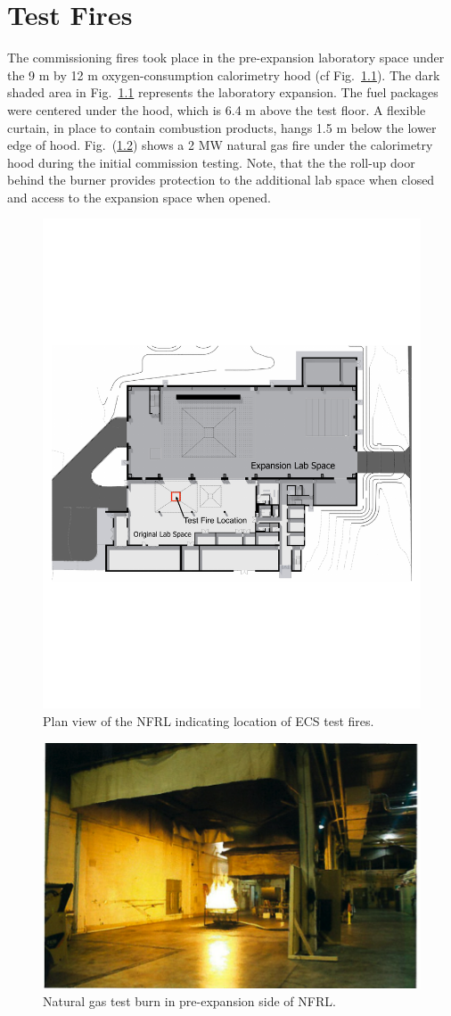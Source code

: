 \documentclass[12pt,oneside]{book}
\begin{document}
\chapter{Test Fires}
\label{test_fire}
The commissioning fires took place in the pre-expansion laboratory space under the 9 m by 12 m oxygen-consumption calorimetry hood (cf Fig.~\ref{fig:NFRL_plan}). The dark shaded area in Fig.~\ref{fig:NFRL_plan} represents the laboratory expansion. The fuel packages were centered under the hood, which is 6.4 m above the test floor. A flexible curtain, in place to contain combustion products, hangs 1.5 m below the lower edge of hood. Fig.~(\ref{fig:NFRL_fire}) shows a 2 MW natural gas fire under the calorimetry hood during the initial commission testing. Note, that the the roll-up door behind the burner provides protection to the additional lab space when closed and access to the expansion space when opened.

\begin{figure}[!ht]
\centering
\includegraphics[width=.8\textwidth]{../Figures/plan_view2}
\caption {Plan view of the NFRL indicating location of ECS test fires.}
\label{fig:NFRL_plan}
\end{figure}

\begin{figure}[!ht]
\centering
\includegraphics[width=.6\textwidth]{../Figures/NFRL_Fire}
\caption {Natural gas test burn in pre-expansion side of NFRL.}
\label{fig:NFRL_fire}
\end{figure}
\end{document}
